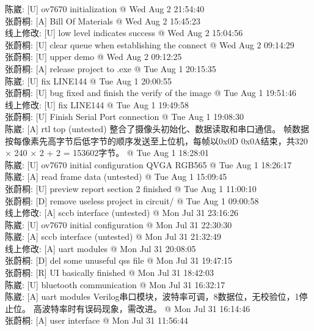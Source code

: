 \documentclass[a4paper]{paper}
\begin{document}
陈崴: [U] ov7670 initialization @ Wed Aug 2 21:54:40\\ 
张蔚桐: [A] Bill Of Materials @ Wed Aug 2 15:45:23\\  
线上修改: [U] low level indicates success @ Wed Aug 2 15:04:56\\ 
张蔚桐: [U] clear queue when establishing the connect @ Wed Aug 2 09:14:29\\ 
张蔚桐: [U] upper demo @ Wed Aug 2 09:12:25\\  
张蔚桐: [A] release project to .exe @ Tue Aug 1 20:15:35\\ 
陈崴: [U] fix LINE144 @ Tue Aug 1 20:00:55\\ 
张蔚桐: [U] bug fixed and finish the verify of the image @ Tue Aug 1 19:51:46\\ 
线上修改: [U] fix LINE144 @ Tue Aug 1 19:49:58\\ 
张蔚桐: [U] Finish Serial Port connection @ Tue Aug 1 19:08:30\\ 
陈崴: [A] rtl top (untested) 	整合了摄像头初始化、数据读取和串口通信。 	帧数据按每像素先高字节后低字节的顺序发送至上位机，每帧以0x0D 0x0A结束，共320 × 240 × 2 + 2 = 153602字节。 @ Tue Aug 1 18:28:01\\ 
陈崴: [U] ov7670 initial configuration 	QVGA RGB565 @ Tue Aug 1 18:26:17\\ 
陈崴: [A] read frame data (untested) @ Tue Aug 1 15:09:45\\ 
张蔚桐: [U] preview report section 2 finished @ Tue Aug 1 11:00:10\\ 
张蔚桐: [D] remove useless project in circuit/ @ Tue Aug 1 09:00:58\\ 
线上修改:  [A] sccb interface (untested) @ Mon Jul 31 23:16:26\\ 
陈崴: [U] ov7670 initial configuration @ Mon Jul 31 22:30:30\\ 
陈崴: [A] sccb interface (untested) @ Mon Jul 31 21:32:49\\ 
线上修改: [A] uart modules @ Mon Jul 31 20:08:05\\ 
张蔚桐: [D] del some unuseful qss file @ Mon Jul 31 19:47:15\\ 
张蔚桐: [R] UI basically finished @ Mon Jul 31 18:42:03\\ 
陈崴: [U] bluetooth communication @ Mon Jul 31 16:32:17\\ 
陈崴: [A] uart modules 	Verilog串口模块，波特率可调，8数据位，无校验位，1停止位。 	高波特率时有误码现象，需改进。 @ Mon Jul 31 16:14:46\\ 
张蔚桐: [A] user interface @ Mon Jul 31 11:56:44\\ 
\end{document}
